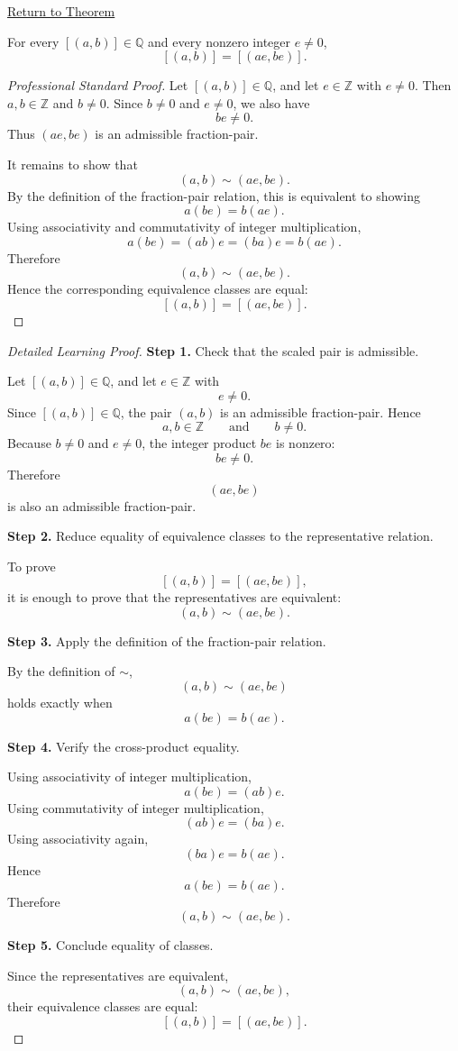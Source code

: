 \newpage
{}
\label{prf:ec-scaling}

\begin{remark*}[Return]
\hyperref[thm:ec-scaling]{Return to Theorem}
\end{remark*}

\begin{theorem*}
For every $[(a,b)]\in\mathbb{Q}$ and every nonzero integer $e\neq 0$,
\[
[(a,b)] = [(ae,be)].
\]
\end{theorem*}

\begin{proof}[Professional Standard Proof]
\LRAProofBodyStart
Let $[(a,b)]\in\mathbb{Q}$, and let $e\in\mathbb{Z}$ with $e\neq 0$.
Then $a,b\in\mathbb{Z}$ and $b\neq 0$. Since $b\neq 0$ and $e\neq 0$,
we also have
\[
be\neq 0.
\]
Thus $(ae,be)$ is an admissible fraction-pair.

It remains to show that
\[
(a,b)\sim(ae,be).
\]
By the definition of the fraction-pair relation, this is equivalent to showing
\[
a(be)=b(ae).
\]
Using associativity and commutativity of integer multiplication,
\[
a(be)=(ab)e=(ba)e=b(ae).
\]
Therefore
\[
(a,b)\sim(ae,be).
\]
Hence the corresponding equivalence classes are equal:
\[
[(a,b)] = [(ae,be)].
\]
\end{proof}

\begin{proof}[Detailed Learning Proof]
\LRAProofBodyStart

\textbf{Step 1.} Check that the scaled pair is admissible.

Let $[(a,b)]\in\mathbb{Q}$, and let $e\in\mathbb{Z}$ with
\[
e\neq 0.
\]
Since $[(a,b)]\in\mathbb{Q}$, the pair $(a,b)$ is an admissible
fraction-pair. Hence
\[
a,b\in\mathbb{Z}
\qquad\text{and}\qquad
b\neq 0.
\]
Because $b\neq 0$ and $e\neq 0$, the integer product $be$ is nonzero:
\[
be\neq 0.
\]
Therefore
\[
(ae,be)
\]
is also an admissible fraction-pair.

\textbf{Step 2.} Reduce equality of equivalence classes to the representative relation.

To prove
\[
[(a,b)] = [(ae,be)],
\]
it is enough to prove that the representatives are equivalent:
\[
(a,b)\sim(ae,be).
\]

\textbf{Step 3.} Apply the definition of the fraction-pair relation.

By the definition of $\sim$,
\[
(a,b)\sim(ae,be)
\]
holds exactly when
\[
a(be)=b(ae).
\]

\textbf{Step 4.} Verify the cross-product equality.

Using associativity of integer multiplication,
\[
a(be)=(ab)e.
\]
Using commutativity of integer multiplication,
\[
(ab)e=(ba)e.
\]
Using associativity again,
\[
(ba)e=b(ae).
\]
Hence
\[
a(be)=b(ae).
\]
Therefore
\[
(a,b)\sim(ae,be).
\]

\textbf{Step 5.} Conclude equality of classes.

Since the representatives are equivalent,
\[
(a,b)\sim(ae,be),
\]
their equivalence classes are equal:
\[
[(a,b)] = [(ae,be)].
\]
\end{proof}

